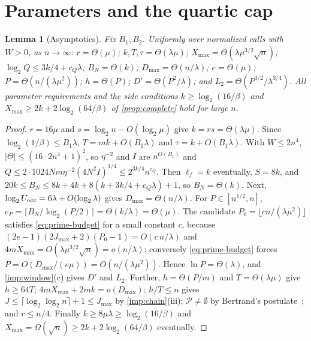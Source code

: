 \documentclass[11pt,letterpaper]{article}
\newtheorem{lemma}[theorem]{Lemma}
\theoremstyle{definition}
\theoremstyle{remark}
\newcommand{\cP}{\mathcal P}
\newcommand{\lgx}{\log_2}
\newcommand{\Xmax}{X_{\max}}
\begin{document}
\section{Parameters and the quartic cap}\label{sec:asymptotics}

\begin{lemma}[Asymptotics]\label{lem:asymptotics}
Fix \(B_1,B_2\). Uniformly over normalized calls with \(W>0\), as \(n\to\infty\):
\(r=\Theta(\mu)\); \(k,T,\tau=\Theta(\lambda\mu)\);
\(\Xmax=\Theta(\lambda\mu^{3/2}\sqrt n)\); \(\lgx Q\le3k/4+c_Q\lambda\);
\(B_N=\Theta(k)\); \(D_{\max}=\Theta(n/\lambda)\); \(e=\Theta(\mu)\);
\(P=\Theta(n/(\lambda\mu^2))\); \(h=\Theta(P)\); \(D'=\Theta(P^2/\lambda)\);
and \(L_2=\Theta(P^{3/2}/\lambda^{3/4})\). All parameter requirements
and the side conditions \(k\ge\lgx(16/\beta)\) and
\(\Xmax\ge2k+2\lgx(64/\beta)\) of \cref{prop:complete} hold for large
\(n\).
\end{lemma}
\begin{proof}
\(r=16\mu\) and \(s=\lgx n-O(\lgx\mu)\) give \(k=rs=\Theta(\lambda\mu)\).
Since \(\lgx(1/\beta)\le B_1\lambda\), \(T=mk+O(B_1\lambda)\) and
\(\tau=k+O(B_1\lambda)\). With \(W\le2n^4\),
\(|\Theta|\le(16\cdot2n^4+1)^2\), so \(\eta^{-2}\) and \(I\) are
\(n^{O(B_1)}\) and \(Q\le2\cdot1024Nm\eta^{-2}(4N^2I)^{1/4}\le2^{3k/4}n^{c_Q}\).
Then \(\ell_f=k\) eventually, \(S=8k\), and
\(20k\le B_N\le8k+4k+8(k+3k/4+c_Q\lambda)+1\), so \(B_N=\Theta(k)\). Next,
\(\lgx U_{\rm occ}=6\lambda+O(\lgx\lambda)\) gives
\(D_{\max}=\Theta(n/\lambda)\). For \(P\in[n^{1/2},n]\),
\(e_P=\lceil B_N/\lgx(P/2)\rceil=\Theta(k/\lambda)=\Theta(\mu)\). The
candidate \(P_0=\lfloor cn/(\lambda\mu^2)\rfloor\) satisfies
\eqref{eq:prime-budget} for a small constant \(c\), because
\((2e-1)(2J_{\max}+2)(P_0-1)=O(c\,n/\lambda)\) and
\(4m\Xmax=O(\lambda\mu^{3/2}\sqrt n)=o(n/\lambda)\); conversely
\eqref{eq:prime-budget} forces \(P=O(D_{\max}/(e\mu))=O(n/(\lambda\mu^2))\).
Hence \(\ln P=\Theta(\lambda)\), and \cref{imp:window}(c) gives \(D'\)
and \(L_2\). Further, \(h=\Theta(P/m)\) and \(T=\Theta(\lambda\mu)\) give
\(h\ge64T\); \(4m\Xmax+2mk=o(D_{\max})\); \(h/T\le n\) gives
\(J\le\lceil\lgx\lgx n\rceil+1\le J_{\max}\) by \cref{imp:chain}(iii);
\(\cP\ne\emptyset\) by Bertrand's postulate~\cite{Erdos32}; and
\(r\le n/4\). Finally \(k\ge8\mu\lambda\ge\lgx(16/\beta)\) and
\(\Xmax=\Omega(\sqrt n)\ge2k+2\lgx(64/\beta)\) eventually.
\end{proof}
\end{document}
